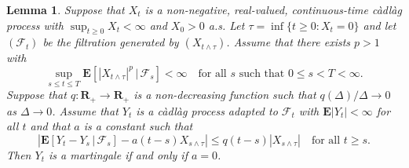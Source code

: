 \documentclass[10pt]{amsart}
\let\mathcal\mathscr
\theoremstyle{plain}
\numberwithin{theorem}{section}
\newtheorem{lemma}[theorem]{Lemma}
\theoremstyle{definition}
\newcommand{\CF}{{\mathcal F}}
\newcommand \E {{\mathbf E}}
\newcommand{\R}{\mathbf{R}}
\newcommand{\cadlag}{càdlàg}
\newcommand{\giv}{\,|\,}
\begin{document}
\begin{lemma}
\label{lem::m_t_martingale}
Suppose that $X_t$ is a non-negative, real-valued, continuous-time {\cadlag} process with $\sup_{t \geq 0} X_t < \infty$ and $X_0 > 0$ a.s. Let $\tau = \inf\{t \geq 0 : X_t = 0\}$ and let $(\CF_t)$ be the filtration generated by $(X_{t \wedge \tau})$. Assume that there exists $p > 1$ with
\begin{equation}
\label{eqn::x_u_ui}
\sup_{s \leq t \leq T}\E[ |X_{t \wedge \tau}|^p \giv \CF_s] < \infty \quad\text{for all $s$ such that } 0 \leq s < T < \infty.
\end{equation}
Suppose that $q \colon \R_+ \to \R_+$ is a non-decreasing function such that $q(\Delta)/\Delta \to 0$ as $\Delta \to 0$. Assume that $Y_t$ is a {\cadlag} process adapted to $\CF_t$ with $\E|Y_t| < \infty$ for all $t$ and that $a$ is a constant such that
\[
\left| \E[ Y_t - Y_s \giv \CF_s ] - a (t-s) X_{s \wedge \tau} \right| \leq q(t-s)|X_{s\wedge \tau}| \quad\text{for all } t \geq s.
\]
Then $Y_t$ is a martingale if and only if $a=0$.
\end{lemma}
\end{document}
